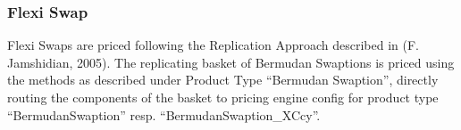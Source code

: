 \subsubsection{Flexi Swap}
\label{pricing:ir_flexiswap}

Flexi Swaps are priced following the Replication Approach described in (F. Jamshidian, 2005). The replicating basket of
Bermudan Swaptions is priced using the methods as described under Product Type ``Bermudan Swaption'', directly routing
the components of the basket to pricing engine config for product type ``BermudanSwaption''
resp. ``BermudanSwaption\_XCcy''.
